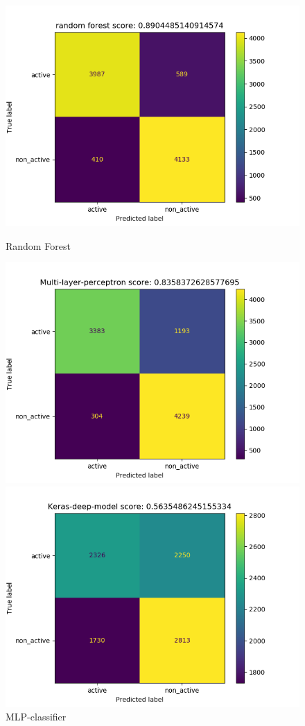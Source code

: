 \documentclass[12pt]{article}
\begin{document}
\begin{figure}[!htb]
  \includegraphics[width=\linewidth]{./figures/random_forest_confusion_matrix.png}
  \caption{Random Forest}\label{fig:conf_m1}
\endminipage\hfill
{}
  \includegraphics[width=\linewidth]{./figures/Mulit-layer-perceptron_confusion_matrix.png}
  \caption{MLP-classifier}\label{fig:conf_m2}
\endminipage\hfill
{}%
  \includegraphics[width=\linewidth]{./figures/keras-deep-model-confusion_matrix.png}

\end{figure}
\end{document}
